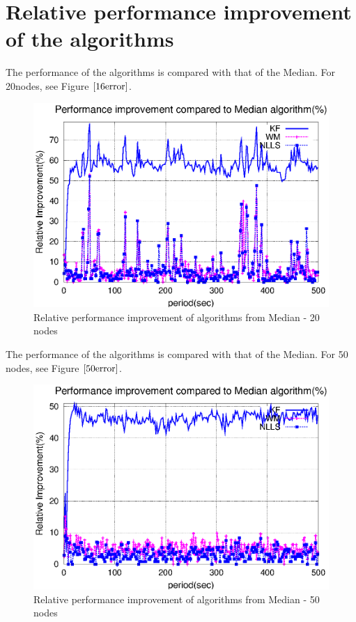 \documentclass[a4paper,10pt]{report}
\begin{document}
\section{\textbf{Relative performance improvement of the algorithms}}
The performance of the algorithms is compared with that of the Median. For 20nodes, see Figure $\ref{16error}$.
\begin{figure}[!h]
\centering
\includegraphics[width= 0.7 \textwidth]{16output-error}
\caption{Relative performance improvement of algorithms from Median - 20 nodes} \label{16error}
\end{figure}
The performance of the algorithms is compared with that of the Median. For 50 nodes, see Figure $\ref{50error}$.
\begin{figure}[!h]
\centering
\includegraphics[width=0.7  \textwidth]{50output-error}
\caption{Relative performance improvement of algorithms from Median - 50 nodes} \label{50error}
\end{figure}
\end{document}
